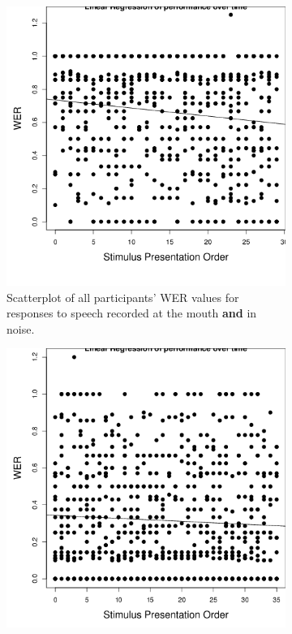 %
\begin{figure}[ht]%
\centering
\begin{subfigure}{0.47\textwidth}
\centering

\includegraphics[width=\maxwidth]{figure/line_graph_chrono_m-1} 

\caption{Scatterplot of all participants' WER values for responses to speech recorded at the mouth \textbf{and} in noise.}
\label{fig:linear_performance_m}
\end{subfigure}
\hfill
\begin{subfigure}{0.47\textwidth}%
\centering

\includegraphics[width=\maxwidth]{figure/line_graph_chrono-1} 


\end{subfigure}
\end{figure}
